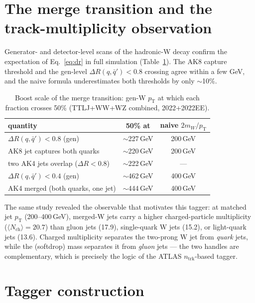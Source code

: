 \documentclass[11pt,a4paper]{article}
\newcommand{\pt}{\ensuremath{p_{\mathrm{T}}}}
\newcommand{\drqq}{\ensuremath{\Delta R(q,\bar{q}')}}
\begin{document}
\section{The merge transition and the track-multiplicity observation}
\label{sec:kine}

Generator- and detector-level scans of the hadronic-W decay confirm the
expectation of Eq.~\eqref{eq:dr} in full simulation
(Table~\ref{tab:merge}). The AK8 capture threshold and the gen-level
$\drqq < 0.8$ crossing agree within a few GeV, and the naive formula
underestimates both thresholds by only $\sim$10\%.

\begin{table}[htb]
  \centering
  \caption{Boost scale of the merge transition: gen-W \pt{} at which each
    fraction crosses 50\% (TTLJ+WW+WZ combined, 2022+2022EE).}
  \label{tab:merge}
  \begin{tabular}{lcc}
    \hline
    quantity & 50\% at & naive $2m_W/\pt$ \\
    \hline
    $\drqq < 0.8$ (gen)            & $\sim$227\,GeV & 200\,GeV \\
    AK8 jet captures both quarks   & $\sim$220\,GeV & 200\,GeV \\
    two AK4 jets overlap ($\Delta R<0.8$) & $\sim$222\,GeV & --- \\
    $\drqq < 0.4$ (gen)            & $\sim$462\,GeV & 400\,GeV \\
    AK4 merged (both quarks, one jet) & $\sim$444\,GeV & 400\,GeV \\
    \hline
  \end{tabular}
\end{table}

The same study revealed the observable that motivates this tagger: at
matched jet \pt{} (200--400\,GeV), merged-W jets carry a higher
charged-particle multiplicity ($\langle N_{\mathrm{ch}}\rangle = 20.7$) than
gluon jets (17.9), single-quark W jets (15.2), or light-quark jets (13.6).
Charged multiplicity separates the two-prong W jet from \emph{quark} jets,
while the (softdrop) mass separates it from \emph{gluon} jets --- the two
handles are complementary, which is precisely the logic of the ATLAS
$n_{\mathrm{trk}}$-based tagger.

\section{Tagger construction}
\label{sec:tagger}
\end{document}
